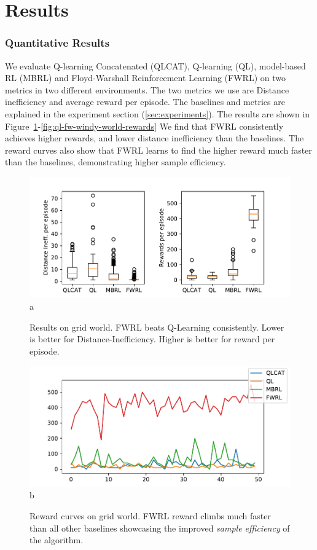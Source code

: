 \section{Results}
\subsubsection{Quantitative Results}
We evaluate Q-learning Concatenated (QLCAT), Q-learning (QL), model-based RL
(MBRL) and Floyd-Warshall Reinforcement Learning (FWRL) on two metrics in two
different environments. The two metrics we use are Distance inefficiency and
average reward per episode. The baselines and metrics are explained in the
experiment section (\ref{sec:experiments}). The results are shown in
Figure~\ref{fig:ql-fw-grid-world-results}-\ref{fig:ql-fw-windy-world-rewards} 
We find that FWRL consistently achieves higher rewards, and lower distance
inefficiency than the baselines. The reward curves also show that FWRL learns to
find the higher reward much faster than the baselines, demonstrating higher
sample efficiency.

\begin{figure}%
  \includegraphics[width=\columnwidth]{./media/metrics-grid-world.pdf}{a}
  \caption{Results on grid world. FWRL beats Q-Learning
    consistently. Lower is better for Distance-Inefficiency. Higher
    is better for reward per episode. }
  \label{fig:ql-fw-grid-world-results}%
\end{figure}

\begin{figure}
  \includegraphics[width=\columnwidth]{./media/rewards-metrics-grid-world.pdf}{b}
  \caption{Reward curves on grid world. FWRL reward climbs much
    faster than all other baselines showcasing the improved \emph{sample
      efficiency} of the algorithm.}
  \label{fig:ql-fw-grid-world-reward-curves}%
\end{figure}

